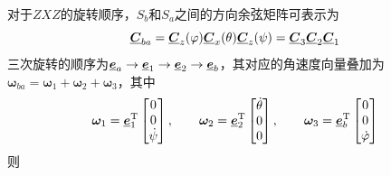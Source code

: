 
对于$ZXZ$的旋转顺序，$S_b$和$S_a$之间的方向余弦矩阵可表示为
\begin{equation*}
	\underline{\bm{C}}_{ba} = \underline{\bm{C}}_z (\varphi) \underline{\bm{C}}_x (\theta) \underline{\bm{C}}_z (\psi) = \underline{\bm{C}}_3 \underline{\bm{C}}_2 \underline{\bm{C}}_1
\end{equation*}
三次旋转的顺序为$\underline{\bm{e}}_a \to \underline{\bm{e}}_1 \to \underline{\bm{e}}_2 \to \underline{\bm{e}}_b$，其对应的角速度向量叠加为$\bm{\omega}_{ba} = \bm{\omega}_1 + \bm{\omega}_2 + \bm{\omega}_3$，其中
\begin{equation}
	\bm{\omega}_1 = \underline{\bm{e}}_1^{\text{T}} 
	\begin{bmatrix}
		0 \\
		0 \\
		\dot{\psi}
	\end{bmatrix},
	\qquad 
	\bm{\omega}_2 = \underline{\bm{e}}_2^{\text{T}} 
	\begin{bmatrix}
		\dot{\theta} \\
		0 \\
		0
	\end{bmatrix},
	\qquad 
	\bm{\omega}_3 = \underline{\bm{e}}_b^{\text{T}} 
	\begin{bmatrix}
		0 \\
		0 \\
		\dot{\varphi}
	\end{bmatrix}
\end{equation}
则
